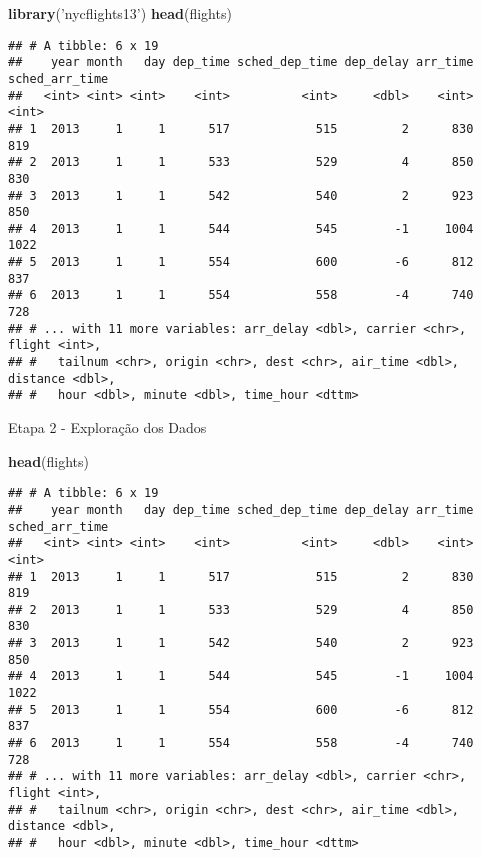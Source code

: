 \documentclass[]{article}
\newenvironment{Shaded}{\begin{snugshade}}{\end{snugshade}}
\newcommand{\KeywordTok}[1]{\textcolor[rgb]{0.13,0.29,0.53}{\textbf{#1}}}
\newcommand{\NormalTok}[1]{#1}
\newcommand{\StringTok}[1]{\textcolor[rgb]{0.31,0.60,0.02}{#1}}
\begin{document}
\begin{Shaded}
\begin{Highlighting}[]
\KeywordTok{library}\NormalTok{(}\StringTok{'nycflights13'}\NormalTok{)}
\KeywordTok{head}\NormalTok{(flights)}
\end{Highlighting}
\end{Shaded}

\begin{verbatim}
## # A tibble: 6 x 19
##    year month   day dep_time sched_dep_time dep_delay arr_time sched_arr_time
##   <int> <int> <int>    <int>          <int>     <dbl>    <int>          <int>
## 1  2013     1     1      517            515         2      830            819
## 2  2013     1     1      533            529         4      850            830
## 3  2013     1     1      542            540         2      923            850
## 4  2013     1     1      544            545        -1     1004           1022
## 5  2013     1     1      554            600        -6      812            837
## 6  2013     1     1      554            558        -4      740            728
## # ... with 11 more variables: arr_delay <dbl>, carrier <chr>, flight <int>,
## #   tailnum <chr>, origin <chr>, dest <chr>, air_time <dbl>, distance <dbl>,
## #   hour <dbl>, minute <dbl>, time_hour <dttm>
\end{verbatim}

Etapa 2 - Exploração dos Dados

\begin{Shaded}
\begin{Highlighting}[]
\KeywordTok{head}\NormalTok{(flights)}
\end{Highlighting}
\end{Shaded}

\begin{verbatim}
## # A tibble: 6 x 19
##    year month   day dep_time sched_dep_time dep_delay arr_time sched_arr_time
##   <int> <int> <int>    <int>          <int>     <dbl>    <int>          <int>
## 1  2013     1     1      517            515         2      830            819
## 2  2013     1     1      533            529         4      850            830
## 3  2013     1     1      542            540         2      923            850
## 4  2013     1     1      544            545        -1     1004           1022
## 5  2013     1     1      554            600        -6      812            837
## 6  2013     1     1      554            558        -4      740            728
## # ... with 11 more variables: arr_delay <dbl>, carrier <chr>, flight <int>,
## #   tailnum <chr>, origin <chr>, dest <chr>, air_time <dbl>, distance <dbl>,
## #   hour <dbl>, minute <dbl>, time_hour <dttm>
\end{verbatim}
\end{document}
